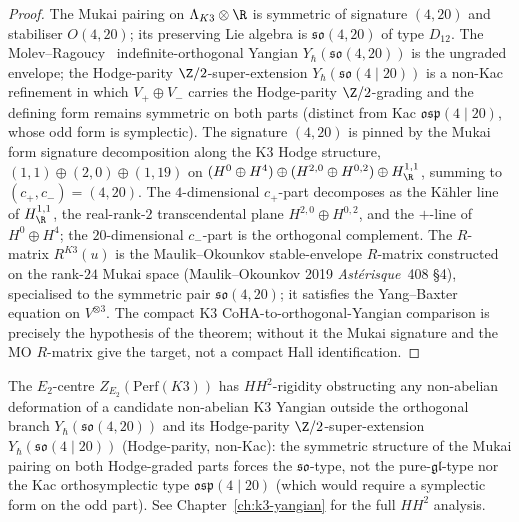 \begin{proof}
The Mukai pairing on $\Lambda_{K3} \otimes \R$ is symmetric of
signature $(4, 20)$ and stabiliser $O(4, 20)$; its preserving Lie
algebra is $\mathfrak{so}(4, 20)$ of type $D_{12}$. The
Molev--Ragoucy~\cite{MolevRagoucy2008} indefinite-orthogonal Yangian
$Y_\hbar(\mathfrak{so}(4, 20))$ is the ungraded envelope; the
Hodge-parity $\Z/2$-super-extension
$Y_\hbar(\mathfrak{so}(4 \mid 20))$ is a non-Kac refinement
in which $V_+ \oplus V_-$ carries the Hodge-parity $\Z/2$-grading
and the defining form remains symmetric on both parts (distinct from
Kac $\mathfrak{osp}(4 \mid 20)$, whose odd form is symplectic). The
signature $(4, 20)$ is pinned by the Mukai form signature decomposition
along the K$3$ Hodge structure,
$(1, 1) \oplus (2, 0) \oplus (1, 19)$ on
$(H^0 \oplus H^4) \oplus (H^{2, 0} \oplus H^{0, 2}) \oplus H^{1, 1}_\R$,
summing to $(c_+, c_-) = (4, 20)$. The $4$-dimensional $c_+$-part
decomposes as the K\"ahler line of $H^{1, 1}_\R$, the real-rank-$2$
transcendental plane $H^{2, 0} \oplus H^{0, 2}$, and the
$+$-line of $H^0 \oplus H^4$; the $20$-dimensional $c_-$-part is
the orthogonal complement.
The $R$-matrix $R^{K3}(u)$ is the Maulik--Okounkov stable-envelope
$R$-matrix constructed on the rank-$24$ Mukai space (Maulik--Okounkov
2019 \emph{Ast\'erisque}~408 \S 4), specialised to the symmetric
pair $\mathfrak{so}(4, 20)$; it satisfies the Yang--Baxter equation
on $V^{\otimes 3}$. The compact K$3$ CoHA-to-orthogonal-Yangian
comparison is precisely the hypothesis of the theorem; without it the
Mukai signature and the MO \(R\)-matrix give the target, not a compact
Hall identification.
\end{proof}

\begin{remark}
\label{gluing:rem:k3-yangian-HH2-rigidity}
The $E_2$-centre $Z_{E_2}(\mathrm{Perf}(K3))$ has $H\!H^2$-rigidity
obstructing any non-abelian deformation of a candidate non-abelian
K$3$ Yangian outside the orthogonal branch
$Y_\hbar(\mathfrak{so}(4, 20))$ and its Hodge-parity
$\Z/2$-super-extension $Y_\hbar(\mathfrak{so}(4 \mid 20))$
(Hodge-parity, non-Kac): the symmetric structure of the Mukai
pairing on both Hodge-graded parts forces the $\mathfrak{so}$-type,
not the pure-$\mathfrak{gl}$-type nor the Kac orthosymplectic type
$\mathfrak{osp}(4 \mid 20)$ (which would require a symplectic form
on the odd part). See Chapter~\ref{ch:k3-yangian} for the full
$H\!H^2$ analysis.
\end{remark}

